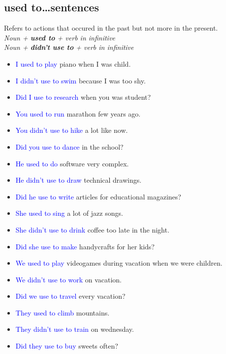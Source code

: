 \subsection{used to\dots sentences}
\begin{multicols}{2}
Refers to actions that occured in the past but not more in the present.\\
\emph{Noun + \textbf{used to} + verb in infinitive}\\
\emph{Noun + \textbf{didn't use to} + verb in infinitive}\\

\begin{itemize}
\item \textcolor{blue}{I used to play} piano when I was child.
\item \textcolor{blue}{I didn't use to swim} because I was too shy.
\item \textcolor{blue}{Did I use to research} when you was student?

\item \textcolor{blue}{You used to run} marathon few years ago.
\item \textcolor{blue}{You didn't use to hike} a lot like now.
\item \textcolor{blue}{Did you use to dance} in the school?

\item \textcolor{blue}{He used to do} software very complex.
\item \textcolor{blue}{He didn't use to draw} technical drawings.
\item \textcolor{blue}{Did he use to write} articles for educational magazines?

\item \textcolor{blue}{She used to sing} a lot of jazz songs.
\item \textcolor{blue}{She didn't use to drink} coffee too late in the night.
\item \textcolor{blue}{Did she use to make} handycrafts for her kids?

\item \textcolor{blue}{We used to play} videogames during vacation when we were children.
\item \textcolor{blue}{We didn't use to work} on vacation.
\item \textcolor{blue}{Did we use to travel} every vacation?

\item \textcolor{blue}{They used to climb} mountains.
\item \textcolor{blue}{They didn't use to train} on wednesday.
\item \textcolor{blue}{Did they use to buy} sweets often?
\end{itemize}
\end{multicols}

